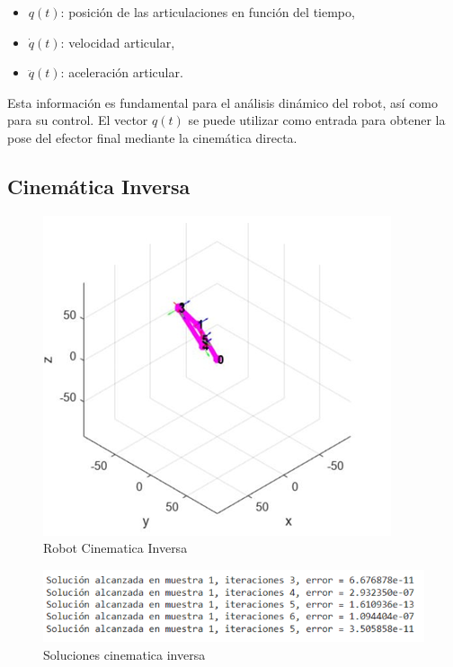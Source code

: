 \begin{itemize}
	\item $q(t)$: posición de las articulaciones en función del tiempo,
	\item $\dot{q}(t)$: velocidad articular,
	\item $\ddot{q}(t)$: aceleración articular.
\end{itemize}

Esta información es fundamental para el análisis dinámico del robot, así como para su control. El vector $q(t)$ se puede utilizar como entrada para obtener la pose del efector final mediante la cinemática directa.

\newpage

\subsection{Cinemática Inversa}
\begin{figure} [h]
	\centering
	\includegraphics[width=0.7\linewidth]{img/robotcininv}
	\caption{Robot Cinematica Inversa}
	\label{fig:robotcininv}
\end{figure}

\begin{figure} [h]
	\centering
	\includegraphics[width=0.7\linewidth]{img/solucionescininv}
	\caption{Soluciones cinematica inversa}
	\label{fig:solucionescininv}
\end{figure}
		
